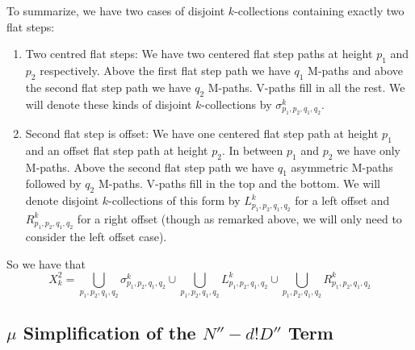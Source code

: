 \documentclass[11pt]{article}
\theoremstyle{definition}
\theoremstyle{definition}
\theoremstyle{plain}
\theoremstyle{plain}
\theoremstyle{plain}
\theoremstyle{definition}
\begin{document}
To summarize, we have two cases of disjoint $k$-collections containing exactly two flat steps:
\begin{enumerate}[label=(\alph*)]
\item Two centred flat steps: We have two centered flat step paths at height $p_1$ and $p_2$ respectively. Above the first flat step path we have $q_1$ M-paths and above the second flat step path we have $q_2$ M-paths. V-paths fill in all the rest. We will denote these kinds of disjoint $k$-collections by $\sigma_{p_1,p_2,q_1,q_2}^k$.
\item Second flat step is offset: We have one centered flat step path at height $p_1$ and an offset flat step path at height $p_2$. In between $p_1$ and $p_2$ we have only M-paths. Above the second flat step path we have $q_1$ asymmetric M-paths followed by $q_2$ M-paths. V-paths fill in the top and the bottom. We will denote disjoint $k$-collections of this form by $L_{p_1,p_2,q_1,q_2}^k$ for a left offset and $R_{p_1,p_2,q_1,q_2}^k$ for a right offset (though as remarked above, we will only need to consider the left offset case).
\end{enumerate}

So we have that
\begin{equation*}
X_{k}^2 = \bigcup\limits_{p_1,p_2,q_1,q_2}\sigma_{p_1,p_2,q_1,q_2}^k \cup \bigcup\limits_{p_1,p_2,q_1,q_2}L_{p_1,p_2,q_1,q_2}^k \cup \bigcup\limits_{p_1,p_2,q_1,q_2}R_{p_1,p_2,q_1,q_2}^k
\end{equation*}

\subsection{$\mu$ Simplification of the $N''-d!D''$ Term}
\end{document}
